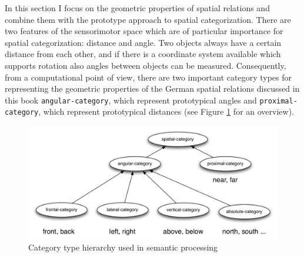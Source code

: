 In this section I focus on the geometric properties of spatial relations 
and combine them with the prototype approach to spatial categorization. 
There are two features of the sensorimotor space which are of particular
importance for spatial categorization: distance and angle. Two objects 
always have a certain distance from each other, and if there is a
coordinate system available which supports rotation also angles 
between objects can be measured. 
Consequently, from a computational point of view, there are two 
important category types for representing the geometric properties 
of the German spatial relations discussed in this book {\footnotesize\tt angular-category}, 
which represent prototypical angles and {\footnotesize\tt proximal-category}, 
which represent prototypical distances (see Figure \ref{f:category-hierarchy} for an overview).

\begin{figure}
\includegraphics[width=1\columnwidth]{figs/category-hierarchy.pdf}
\caption[Category type hierarchy]{Category type hierarchy 
used in semantic processing}
\label{f:category-hierarchy}
\end{figure}

